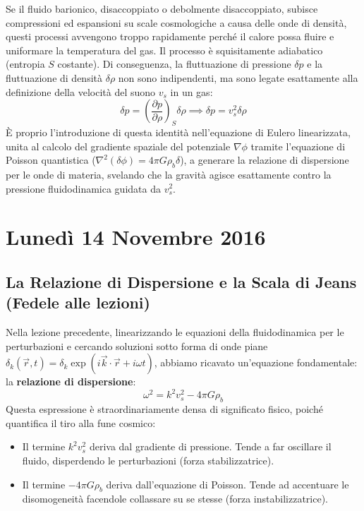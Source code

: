 \documentclass[11pt,a4paper]{report}
\begin{document}
Se il fluido barionico, disaccoppiato o debolmente disaccoppiato, subisce compressioni ed espansioni su scale cosmologiche a causa delle onde di densità, questi processi avvengono troppo rapidamente perché il calore possa fluire e uniformare la temperatura del gas. Il processo è squisitamente adiabatico (entropia $S$ costante).
Di conseguenza, la fluttuazione di pressione $\delta p$ e la fluttuazione di densità $\delta\rho$ non sono indipendenti, ma sono legate esattamente alla definizione della velocità del suono $v_s$ in un gas:
\begin{equation}
\delta p = \left(\frac{\partial p}{\partial \rho}\right)_S \delta\rho \implies \delta p = v_s^2 \delta\rho
\end{equation}
È proprio l'introduzione di questa identità nell'equazione di Eulero linearizzata, unita al calcolo del gradiente spaziale del potenziale $\nabla \phi$ tramite l'equazione di Poisson quantistica ($\nabla^2 (\delta\phi) = 4\pi G \rho_b \delta$), a generare la relazione di dispersione per le onde di materia, svelando che la gravità agisce esattamente contro la pressione fluidodinamica guidata da $v_s^2$.

\chapter{Lunedì 14 Novembre 2016}

\section{La Relazione di Dispersione e la Scala di Jeans (Fedele alle lezioni)}

Nella lezione precedente, linearizzando le equazioni della fluidodinamica per le perturbazioni e cercando soluzioni sotto forma di onde piane $\delta_k(\vec{r}, t) = \delta_k \exp(i\vec{k}\cdot\vec{r} + i\omega t)$, abbiamo ricavato un'equazione fondamentale: la \textbf{relazione di dispersione}:
\begin{equation}
\omega^2 = k^2 v_s^2 - 4\pi G \rho_b
\end{equation}
Questa espressione è straordinariamente densa di significato fisico, poiché quantifica il tiro alla fune cosmico:
\begin{itemize}
    \item Il termine $k^2 v_s^2$ deriva dal gradiente di pressione. Tende a far oscillare il fluido, disperdendo le perturbazioni (forza stabilizzatrice).
    \item Il termine $-4\pi G \rho_b$ deriva dall'equazione di Poisson. Tende ad accentuare le disomogeneità facendole collassare su se stesse (forza instabilizzatrice).
\end{itemize}
\end{document}
